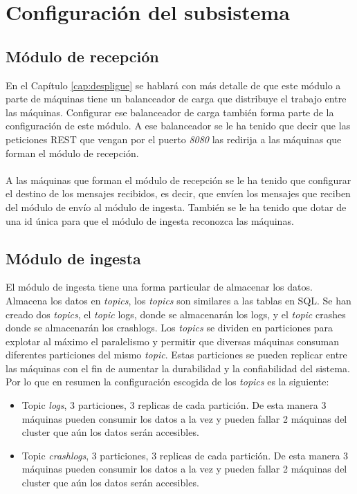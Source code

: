 \section{Configuración del subsistema}

\subsection{Módulo de recepción}

En el Capítulo \ref{cap:despligue} se hablará con más detalle de que este módulo a parte de máquinas tiene un balanceador de carga que distribuye el trabajo entre las máquinas. Configurar ese balanceador de carga también forma parte de la configuración de este módulo. A ese balanceador se le ha tenido que decir que las peticiones REST que vengan por el puerto \textit{8080} las redirija a las máquinas que forman el módulo de recepción.
\\\\
A las máquinas que forman el módulo de recepción se le ha tenido que configurar el destino de los mensajes recibidos, es decir, que envíen los mensajes que reciben del módulo de envío al módulo de ingesta. También se le ha tenido que dotar de una id única para que el módulo de ingesta reconozca las máquinas.

\subsection{Módulo de ingesta}

El módulo de ingesta tiene una forma particular de almacenar los datos. Almacena los datos en \textit{topics}, los \textit{topics} son similares a las tablas en SQL. Se han creado dos \textit{topics}, el \textit{topic} logs, donde se almacenarán los logs, y el \textit{topic} crashes donde se almacenarán los crashlogs. Los \textit{topics} se dividen en particiones para explotar al máximo el paralelismo y permitir que diversas máquinas consuman diferentes particiones del mismo \textit{topic}. Estas particiones se pueden replicar entre las máquinas con el fin de aumentar la durabilidad y la confiabilidad del sistema. Por lo que en resumen la configuración escogida de los \textit{topics} es la siguiente:

\begin{itemize}
	\item Topic \textit{logs}, 3 particiones, 3 replicas de cada partición. De esta manera 3 máquinas pueden consumir los datos a la vez y pueden fallar 2 máquinas del cluster que aún los datos serán accesibles.
	\item Topic \textit{crashlogs}, 3 particiones, 3 replicas de cada partición. De esta manera 3 máquinas pueden consumir los datos a la vez y pueden fallar 2 máquinas del cluster que aún los datos serán accesibles.
\end{itemize}

